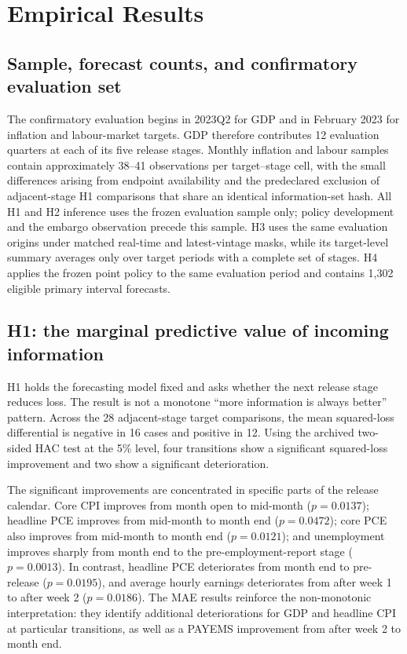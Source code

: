 \section{Empirical Results}
\label{sec:results}

\subsection{Sample, forecast counts, and confirmatory evaluation set}
\label{subsec:results_sample}

The confirmatory evaluation begins in 2023Q2 for GDP and in February 2023 for
inflation and labour-market targets.  GDP therefore contributes 12 evaluation
quarters at each of its five release stages.  Monthly inflation and labour
samples contain approximately 38--41 observations per target--stage cell,
with the small differences arising from endpoint availability and the
predeclared exclusion of adjacent-stage H1 comparisons that share an identical
information-set hash.  All H1 and H2 inference uses the frozen evaluation
sample only; policy development and the embargo observation precede this
sample.  H3 uses the same evaluation origins under matched real-time and
latest-vintage masks, while its target-level summary averages only over
target periods with a complete set of stages.  H4 applies the frozen point
policy to the same evaluation period and contains 1,302 eligible primary
interval forecasts.

\subsection{H1: the marginal predictive value of incoming information}
\label{subsec:h1_results}

H1 holds the forecasting model fixed and asks whether the next release stage
reduces loss.  The result is not a monotone ``more information is always
better'' pattern.  Across the 28 adjacent-stage target comparisons, the mean
squared-loss differential is negative in 16 cases and positive in 12.  Using
the archived two-sided HAC test at the 5\% level, four transitions show a
significant squared-loss improvement and two show a significant
deterioration.

The significant improvements are concentrated in specific parts of the
release calendar.  Core CPI improves from month open to mid-month
(\(p=0.0137\)); headline PCE improves from mid-month to month end
(\(p=0.0472\)); core PCE also improves from mid-month to month end
(\(p=0.0121\)); and unemployment improves sharply from month end to the
pre-employment-report stage (\(p=0.0013\)).  In contrast, headline PCE
deteriorates from month end to pre-release (\(p=0.0195\)), and average hourly
earnings deteriorates from after week 1 to after week 2 (\(p=0.0186\)).
The MAE results reinforce the non-monotonic interpretation: they identify
additional deteriorations for GDP and headline CPI at particular transitions,
as well as a PAYEMS improvement from after week 2 to month end.

